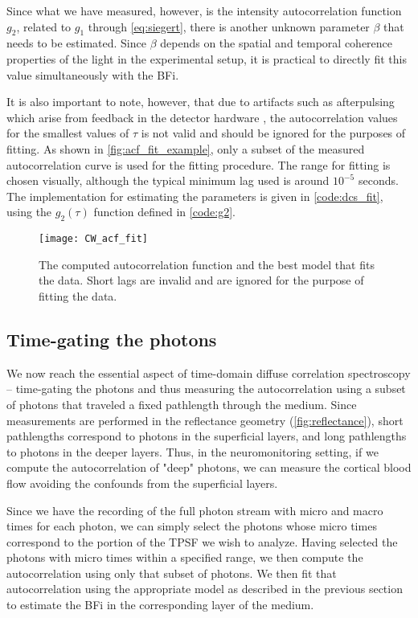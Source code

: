 Since what we have measured, however, is the intensity autocorrelation function $g_2$, related to $g_1$ through \autoref{eq:siegert}, there is another unknown parameter $\beta$ that needs to be estimated. Since $\beta$ depends on the spatial and temporal coherence properties of the light in the experimental setup, it is practical to directly fit this value simultaneously with the BFi.

It is also important to note, however, that due to artifacts such as afterpulsing which arise from feedback in the detector hardware \cite{Zhao2003}, the autocorrelation values for the smallest values of $\tau$ is not valid and should be ignored for the purposes of fitting. As shown in \autoref{fig:acf_fit_example}, only a subset of the measured autocorrelation curve is used for the fitting procedure. The range for fitting is chosen visually, although the typical minimum lag used is around $10^{-5}$ seconds. The implementation for estimating the parameters is given in \autoref{code:dcs_fit}, using the $g_2(\tau)$ function defined in \autoref{code:g2}.

\begin{figure}[tb]
    \centering
    \texttt{[image: CW\_acf\_fit]}  
    \caption{The computed autocorrelation function and the best model that fits the data. Short lags are invalid and are ignored for the purpose of fitting the data.}
    \label{fig:acf_fit_example}  
\end{figure}

\subsection{Time-gating the photons} \label{sec:time-gate}
We now reach the essential aspect of time-domain diffuse correlation spectroscopy -- time-gating the photons and thus measuring the autocorrelation using a subset of photons that traveled a fixed pathlength through the medium. Since measurements are performed in the reflectance geometry (\autoref{fig:reflectance}), short pathlengths correspond to photons in the superficial layers, and long pathlengths to photons in the deeper layers. Thus, in the neuromonitoring setting, if we compute the autocorrelation of "deep" photons, we can measure the cortical blood flow avoiding the confounds from the superficial layers. 

Since we have the recording of the full photon stream with micro and macro times for each photon, we can simply select the photons whose micro times correspond to the portion of the TPSF we wish to analyze. Having selected the photons with micro times within a specified range, we then compute the autocorrelation using only that subset of photons. We then fit that autocorrelation using the appropriate model as described in the previous section to estimate the BFi in the corresponding layer of the medium.

